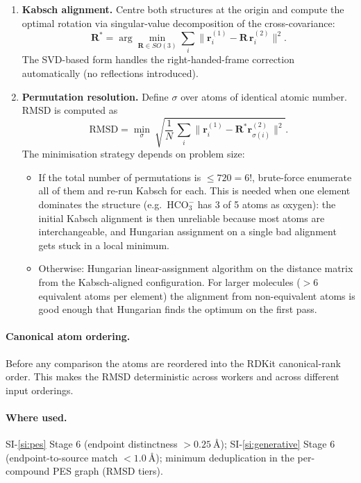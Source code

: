\begin{enumerate}
    \item \textbf{Kabsch alignment.} Centre both structures at the origin and compute the optimal rotation via singular-value decomposition of the cross-covariance:
    \begin{equation}
        \mathbf{R}^* = \arg\min_{\mathbf{R} \in SO(3)} \sum_i \lVert \mathbf{r}_i^{(1)} - \mathbf{R}\,\mathbf{r}_i^{(2)} \rVert^2.
    \end{equation}
    The SVD-based form handles the right-handed-frame correction automatically (no reflections introduced).

    \item \textbf{Permutation resolution.} Define $\sigma$ over atoms of identical atomic number. RMSD is computed as
    \begin{equation}
        \text{RMSD} = \min_{\sigma}\ \sqrt{\frac{1}{N}\,\sum_i \lVert \mathbf{r}_i^{(1)} - \mathbf{R}^* \mathbf{r}_{\sigma(i)}^{(2)} \rVert^2}.
    \end{equation}
    The minimisation strategy depends on problem size:
    \begin{itemize}
        \item If the total number of permutations is $\leq 720 = 6!$, brute-force enumerate all of them and re-run Kabsch for each. This is needed when one element dominates the structure (e.g.\ $\mathrm{HCO_3^-}$ has 3 of 5 atoms as oxygen): the initial Kabsch alignment is then unreliable because most atoms are interchangeable, and Hungarian assignment on a single bad alignment gets stuck in a local minimum.
        \item Otherwise: Hungarian linear-assignment algorithm on the distance matrix from the Kabsch-aligned configuration. For larger molecules ($> 6$ equivalent atoms per element) the alignment from non-equivalent atoms is good enough that Hungarian finds the optimum on the first pass.
    \end{itemize}
\end{enumerate}

\paragraph{Canonical atom ordering.}
Before any comparison the atoms are reordered into the RDKit canonical-rank order. This makes the RMSD deterministic across workers and across different input orderings.

\paragraph{Where used.}
SI-\ref{si:pes} Stage 6 (endpoint distinctness $> \SI{0.25}{\angstrom}$); SI-\ref{si:generative} Stage 6 (endpoint-to-source match $< \SI{1.0}{\angstrom}$); minimum deduplication in the per-compound PES graph (RMSD tiers).


